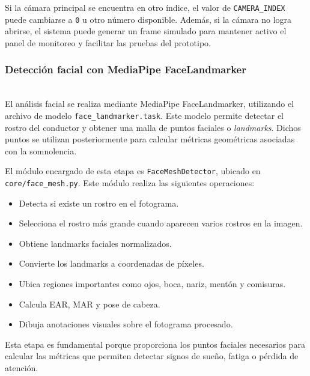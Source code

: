 \documentclass[conference]{IEEEtran}
\begin{document}
Si la cámara principal se encuentra en otro índice, el valor de \texttt{CAMERA\_INDEX} puede cambiarse a \texttt{0} u otro número disponible. Además, si la cámara no logra abrirse, el sistema puede generar un frame simulado para mantener activo el panel de monitoreo y facilitar las pruebas del prototipo.\\

\subsubsection{Detección facial con MediaPipe FaceLandmarker}\mbox{}\\

El análisis facial se realiza mediante MediaPipe FaceLandmarker, utilizando el archivo de modelo \texttt{face\_landmarker.task}. Este modelo permite detectar el rostro del conductor y obtener una malla de puntos faciales o \textit{landmarks}. Dichos puntos se utilizan posteriormente para calcular métricas geométricas asociadas con la somnolencia.

El módulo encargado de esta etapa es \texttt{FaceMeshDetector}, ubicado en \texttt{core/face\_mesh.py}. Este módulo realiza las siguientes operaciones:

\begin{itemize}
    \item Detecta si existe un rostro en el fotograma.
    
    \item Selecciona el rostro más grande cuando aparecen varios rostros en la imagen.
    
    \item Obtiene landmarks faciales normalizados.
    
    \item Convierte los landmarks a coordenadas de píxeles.
    
    \item Ubica regiones importantes como ojos, boca, nariz, mentón y comisuras.
    
    \item Calcula EAR, MAR y pose de cabeza.
    
    \item Dibuja anotaciones visuales sobre el fotograma procesado.
\end{itemize}

Esta etapa es fundamental porque proporciona los puntos faciales necesarios para calcular las métricas que permiten detectar signos de sueño, fatiga o pérdida de atención.\\
\end{document}
